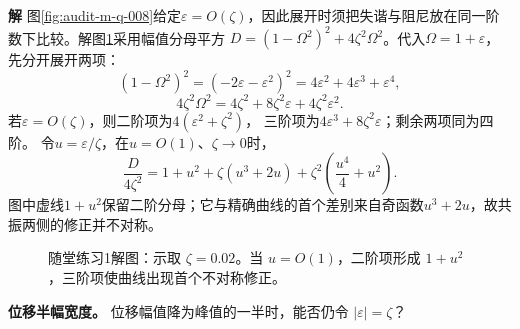 \documentclass[11pt,openany,fontset=fandol]{ctexbook}
\theoremstyle{plain}\newtheorem{theorem}{定理}[chapter]\newtheorem{proposition}[theorem]{命题}
\theoremstyle{definition}\newtheorem{definition}{定义}[chapter]\newtheorem{example}{例}[chapter]
\theoremstyle{remark}\newtheorem*{remark}{说明}
\newcommand{\SolutionStart}{\par\nobreak\medskip\nobreak\noindent\textbf{解}\quad\ignorespaces}
\newenvironment{solution}{\SolutionStart}{\par\medskip}
\begin{document}

\begin{solution}
图\ref{fig:audit-m-q-008}给定$\varepsilon=O(\zeta)$，因此展开时须把失谐与阻尼放在同一阶数下比较。解图\ref{fig:class-1-1}采用幅值分母平方
$D=(1-\Omega^2)^2+4\zeta^2\Omega^2$。代入$\Omega=1+\varepsilon$，先分开展开两项：
\[
 (1-\Omega^2)^2=(-2\varepsilon-\varepsilon^2)^2
 =4\varepsilon^2+4\varepsilon^3+\varepsilon^4,
\]
\[
 4\zeta^2\Omega^2=4\zeta^2+8\zeta^2\varepsilon
 +4\zeta^2\varepsilon^2.
\]
若$\varepsilon=O(\zeta)$，则二阶项为$4(\varepsilon^2+\zeta^2)$，
三阶项为$4\varepsilon^3+8\zeta^2\varepsilon$；剩余两项同为四阶。
令$u=\varepsilon/\zeta$，在$u=O(1)$、$\zeta\to0$时，
\[
 \frac{D}{4\zeta^2}
 =1+u^2+\zeta(u^3+2u)
 +\zeta^2\left(\frac{u^4}{4}+u^2\right).
\]
图中虚线$1+u^2$保留二阶分母；它与精确曲线的首个差别来自奇函数$u^3+2u$，故共振两侧的修正并不对称。

\begin{figure}[H]\centering
{}
\caption{随堂练习1解图：示取 $\zeta=0.02$。当 $u=O(1)$，二阶项形成 $1+u^2$，三阶项使曲线出现首个不对称修正。}\label{fig:class-1-1}
\end{figure}
\end{solution}

\textbf{位移半幅宽度。} 位移幅值降为峰值的一半时，能否仍令 $|\varepsilon|=\zeta$？
\end{document}
